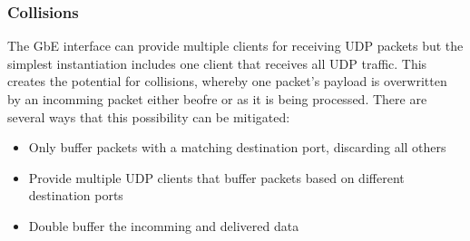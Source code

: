 \documentclass[11pt]{article}
\begin{document}
\subsubsection{Collisions}
The GbE interface can provide multiple clients for receiving UDP packets
but the simplest instantiation includes one client that receives all UDP
traffic.  This creates the potential for collisions, whereby one packet's
payload is overwritten by an incomming packet either beofre or as it is being
processed.  There are several ways that this possibility can be mitigated:
\begin{itemize}
  \item Only buffer packets with a matching destination port, discarding
        all others
  \item Provide multiple UDP clients that buffer packets based on
        different destination ports
  \item Double buffer the incomming and delivered data
\end{itemize}

\appendix
\end{document}
